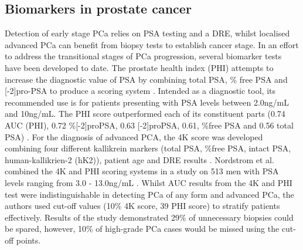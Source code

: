 \subsection{Biomarkers in prostate cancer}
Detection of early stage PCa relies on PSA testing and a DRE, whilst localised advanced PCa can benefit from biopsy tests to establish cancer stage. In an effort to address the transitional stages of PCa progression, several biomarker tests have been developed to date. The prostate health index (PHI) attempts to increase the diagnostic value of PSA by combining total PSA, \% free PSA and [-2]pro-PSA to produce a scoring system \cite{Le2010Apr}. Intended as a diagnostic tool, its recommended use is for patients presenting with PSA levels between 2.0ng/mL and 10ng/mL. The PHI score outperformed each of its constituent parts (0.74 AUC (PHI), 0.72 \%[-2]proPSA, 0.63 [-2]proPSA, 0.61, \%free PSA and 0.56 total PSA) \cite{Stephan2013Jan}. For the diagnosis of advanced PCA, the 4K score was developed combining four different kallikrein markers (total PSA, \%free PSA, intact PSA, human-kallikrien-2 (hK2)), patient age and DRE results \cite{Vickers2010May}. Nordstrom et al. combined the 4K and PHI scoring systems in a study on 513 men with PSA levels ranging from 3.0 - 13.0ng/mL \cite{Nordstrom2015Jul}. Whilst AUC results from the 4K and PHI test were indistinguishable in detecting PCa of any form and advanced PCa, the authors used cut-off values (10\% 4K score, 39 PHI score) to stratify patients effectively. Results of the study demonstrated 29\% of unnecessary biopsies could be spared, however, 10\% of high-grade PCa cases would be missed using the cut-off points. \par
